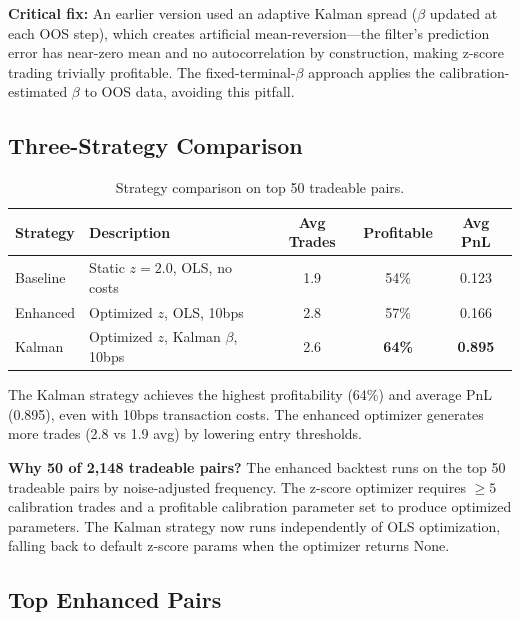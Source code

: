\documentclass[11pt, a4paper]{article}
\begin{document}
\textbf{Critical fix:} An earlier version used an adaptive Kalman spread ($\beta$ updated at each OOS step), which creates artificial mean-reversion---the filter's prediction error has near-zero mean and no autocorrelation by construction, making z-score trading trivially profitable. The fixed-terminal-$\beta$ approach applies the calibration-estimated $\beta$ to OOS data, avoiding this pitfall.

\subsection{Three-Strategy Comparison}

\begin{table}[H]
\centering
\caption{Strategy comparison on top 50 tradeable pairs.}
\begin{tabular}{@{}llccc@{}}
\toprule
\textbf{Strategy} & \textbf{Description} & \textbf{Avg Trades} & \textbf{Profitable} & \textbf{Avg PnL} \\
\midrule
Baseline  & Static $z=2.0$, OLS, no costs & 1.9 & 54\% & 0.123 \\
Enhanced  & Optimized $z$, OLS, 10bps     & 2.8 & 57\% & 0.166 \\
Kalman    & Optimized $z$, Kalman $\beta$, 10bps & 2.6 & \textbf{64\%} & \textbf{0.895} \\
\bottomrule
\end{tabular}
\label{tab:strategy-comparison}
\end{table}

The Kalman strategy achieves the highest profitability (64\%) and average PnL (0.895), even with 10bps transaction costs. The enhanced optimizer generates more trades (2.8 vs 1.9 avg) by lowering entry thresholds.

\textbf{Why 50 of 2,148 tradeable pairs?} The enhanced backtest runs on the top 50 tradeable pairs by noise-adjusted frequency. The z-score optimizer requires $\geq 5$ calibration trades and a profitable calibration parameter set to produce optimized parameters. The Kalman strategy now runs independently of OLS optimization, falling back to default z-score params when the optimizer returns None.

\subsection{Top Enhanced Pairs}
\end{document}
